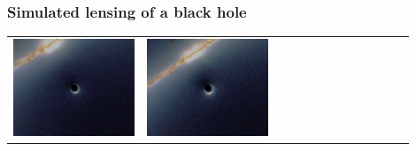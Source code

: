 \documentclass[compress]{beamer}
\begin{document}
\begin{frame}
\frametitle{Simulated lensing of a black hole}

\begin{tabular}{p{0.3\linewidth} p{0.3\linewidth} p{0.3\linewidth}}
\includegraphics[width=\linewidth]{pictures/black_hole_lensing1.png} &
\includegraphics[width=\linewidth]{pictures/black_hole_lensing2.png} &

\end{tabular}
\end{frame}
\end{document}
